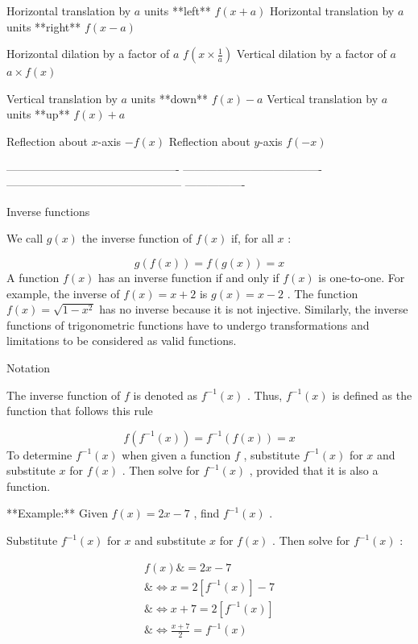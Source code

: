   Horizontal translation by $a$ units **left**   $f(x+a)$
  Horizontal translation by $a$ units **right**   $f(x-a)$

  Horizontal dilation by a factor of $a$         $f\left(x\times\tfrac{1}{a}\right)$
  Vertical dilation by a factor of $a$            $a\times f(x)$

  Vertical translation by $a$ units **down**     $f(x)-a$
  Vertical translation by $a$ units **up**        $f(x)+a$

  Reflection about $x$-axis                      $-f(x)$
  Reflection about $y$-axis                       $f(-x)$

  ---------------------------------------------- -------------------------------------
  ----------------------------------------------- ----------------



Inverse functions



We call $g(x)$ the inverse function of $f(x)$ if, for all $x$ :



$$g(f(x))=f(g(x))=x$$ A function $f(x)$ has an inverse function if and only if $f(x)$ is
one-to-one. For example, the inverse of $f(x)=x+2$ is $g(x)=x-2$ . The function
$f(x)=\sqrt{1-x^2}$ has no inverse because it is not injective. Similarly, the inverse
functions of trigonometric functions have to undergo transformations and limitations to be
considered as valid functions.



Notation



The inverse function of $f$ is denoted as $f^{-1}(x)$ . Thus, $f^{-1}(x)$ is defined as
the function that follows this rule



$$f(f^{-1}(x))=f^{-1}(f(x))=x$$ To determine $f^{-1}(x)$ when given a function $f$ ,
substitute $f^{-1}(x)$ for $x$ and substitute $x$ for $f(x)$ . Then solve for $f^{-1}(x)$
, provided that it is also a function.



**Example:** Given $f(x)=2x-7$ , find $f^{-1}(x)$ .



Substitute $f^{-1}(x)$ for $x$ and substitute $x$ for $f(x)$ . Then solve for $f^{-1}(x)$ :



\begin{align} f(x) \&= 2x - 7 \\ \&\Leftrightarrow x = 2[f^{-1}(x)] - 7 \\ \&\Leftrightarrow x + 7 = 2[f^{-1}(x)] \\ \&\Leftrightarrow \frac{x + 7}{2} = f^{-1}(x) \end{align}



